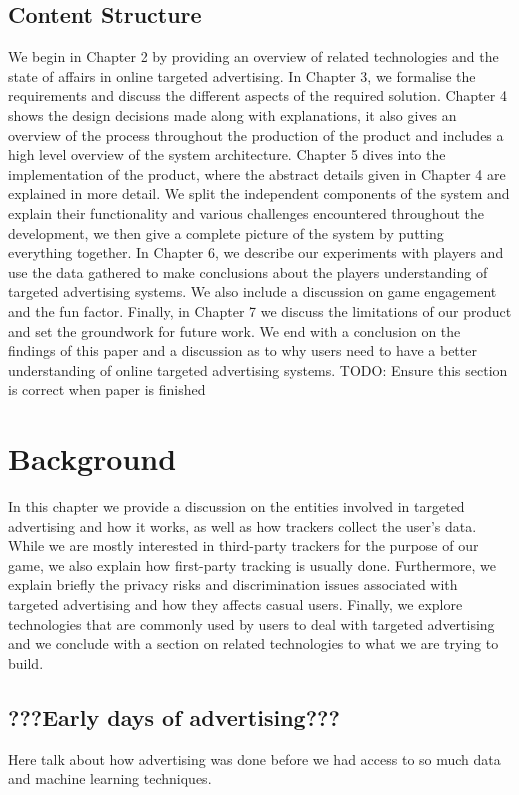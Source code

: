 \documentclass{l4proj}
\begin{document}
\section{Content Structure}
We begin in Chapter 2 by providing an overview of related technologies and the state of affairs in online targeted advertising. In Chapter 3, we formalise the requirements and discuss the different aspects of the required solution. Chapter 4 shows the design decisions made along with explanations, it also gives an overview of the process throughout the production of the product and includes a high level overview of the system architecture. Chapter 5 dives into the implementation of the product, where the abstract details given in Chapter 4 are explained in more detail. We split the independent components of the system and explain their functionality and various challenges encountered throughout the development, we then give a complete picture of the system by putting everything together. In Chapter 6, we describe our experiments with players and use the data gathered to make conclusions about the players understanding of targeted advertising systems. We also include a discussion on game engagement and the fun factor. Finally, in Chapter 7 we discuss the limitations of our product and set the groundwork for future work. We end with a conclusion on the findings of this paper and a discussion as to why users need to have a better understanding of online targeted advertising systems.
TODO: Ensure this section is correct when paper is finished


\chapter{Background}
In this chapter we provide a discussion on the entities involved in targeted advertising and how it works, as well as how trackers collect the user's data. While we are mostly interested in third-party trackers for the purpose of our game, we also explain how first-party tracking is usually done. Furthermore, we explain briefly the privacy risks and discrimination issues associated with targeted advertising and how they affects casual users. Finally, we explore technologies that are commonly used by users to deal with targeted advertising and we conclude with a section on related technologies to what we are trying to build.

\section{???Early days of advertising???}
Here talk about how advertising was done before we had access to so much data and machine learning techniques.
\end{document}

